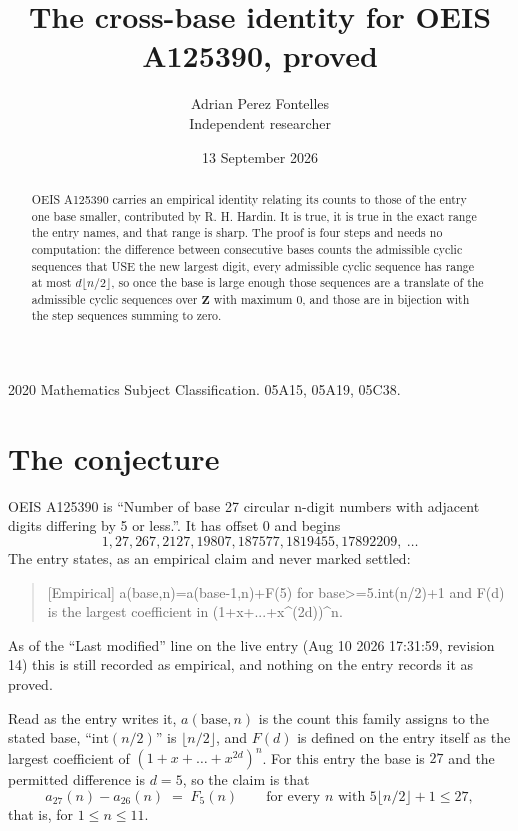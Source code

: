\documentclass[11pt,a4paper]{article}
\title{The cross-base identity for OEIS A125390, proved}
\author{Adrian Perez Fontelles\\ \small Independent researcher}
\date{13 September 2026}
\theoremstyle{plain}
\theoremstyle{definition}
\begin{document}
\maketitle

\begin{abstract}
OEIS A125390 carries an empirical identity relating its counts to those of the entry one base
smaller, contributed by R. H. Hardin. It is true, it is true in the exact range the entry
names, and that range is sharp. The proof is four steps and needs no computation: the
difference between consecutive bases counts the admissible cyclic sequences that USE the new
largest digit, every admissible cyclic sequence has range at most $d\lfloor n/2\rfloor$, so
once the base is large enough those sequences are a translate of the admissible cyclic
sequences over $\mathbf{Z}$ with maximum $0$, and those are in bijection with the step
sequences summing to zero.
\end{abstract}

\noindent\small 2020 Mathematics Subject Classification. 05A15, 05A19, 05C38.\normalsize

\section{The conjecture}

OEIS A125390 is ``Number of base 27 circular n-digit numbers with adjacent digits differing by 5 or less.''. It has offset $0$ and begins
\[
1, 27, 267, 2127, 19807, 187577, 1819455, 17892209,\ \dots
\]
The entry states, as an empirical claim and never marked settled:
\begin{quote}
[Empirical] a(base,n)=a(base-1,n)+F(5) for base>=5.int(n/2)+1 and F(d) is the largest coefficient in (1+x+...+x\textasciicircum{}(2d))\textasciicircum{}n.
\end{quote}
As of the ``Last modified'' line on the live entry (Aug 10 2026 17:31:59, revision 14)
this is still recorded as empirical, and nothing on the entry records it as proved.

Read as the entry writes it, $a(\mathrm{base},n)$ is the count this family assigns to the
stated base, ``$\mathrm{int}(n/2)$'' is $\lfloor n/2\rfloor$, and $F(d)$ is defined on the
entry itself as the largest coefficient of $(1+x+\dots+x^{2d})^{n}$. For this entry
the base is $27$ and the permitted difference is $d=5$, so the claim is that
\[
a_{27}(n)-a_{26}(n)\;=\;F_{5}(n)
\qquad\text{for every } n \text{ with } 5\lfloor n/2\rfloor+1\le27,
\]
that is, for $1\le n\le11$.
\end{document}
